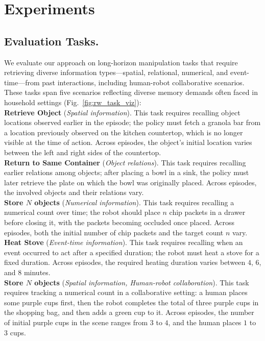 \section{Experiments}
\subsection{Evaluation Tasks.}
We evaluate our approach on long-horizon manipulation tasks that require retrieving diverse information types---spatial, relational, numerical, and event-time---from past interactions, including human-robot collaborative scenarios.
These tasks span five scenarios reflecting diverse memory demands often faced in household settings (Fig.~\ref{fig:rw_task_viz}):
\vspace{0.5em}
\\
\textbf{Retrieve Object} (\textit{Spatial information}).
This task requires recalling object locations observed earlier in the episode; the policy must fetch a granola bar from a location previously observed on the kitchen countertop, which is no longer visible at the time of action.
Across episodes, the object’s initial location varies between the left and right sides of the countertop.
\\
\textbf{Return to Same Container} (\textit{Object relations}).
This task requires recalling earlier relations among objects; after placing a bowl in a sink, the policy must later retrieve the plate on which the bowl was originally placed.
Across episodes, the involved objects and their relations vary.
\\
\textbf{Store $N$ objects} (\textit{Numerical information}).
This task requires recalling a numerical count over time; the robot should place $n$ chip packets in a drawer before closing it, with the packets becoming occluded once placed.
Across episodes, both the initial number of chip packets and the target count $n$ vary.
\\
\textbf{Heat Stove} (\textit{Event-time information}).
This task requires recalling when an event occurred to act after a specified duration; the robot must heat a stove for a fixed duration.
Across episodes, the required heating duration varies between $4$, $6$, and $8$ minutes.
\\
\textbf{Store $N$ objects} (\textit{Spatial information, Human-robot collaboration}).
This task requires tracking a numerical count in a collaborative setting: a human places some purple cups first, then the robot completes the total of three purple cups in the shopping bag, and then adds a green cup to it.
Across episodes, the number of initial purple cups in the scene ranges from $3$ to $4$, and the human places $1$ to $3$ cups.

